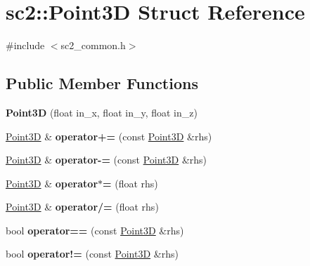 \hypertarget{structsc2_1_1_point3_d}{}\section{sc2\+:\+:Point3D Struct Reference}
\label{structsc2_1_1_point3_d}


{\ttfamily \#include $<$sc2\+\_\+common.\+h$>$}

\subsection*{Public Member Functions}
\begin{DoxyCompactItemize}
\item 
\mbox{\label{structsc2_1_1_point3_d_a7da22c63b07e4b874f2151f943f4c111}} 
{\bfseries Point3D} (float in\+\_\+x, float in\+\_\+y, float in\+\_\+z)
\item 
\mbox{\label{structsc2_1_1_point3_d_a84b5ebf7f19a364294347972bc489443}} 
\hyperlink{structsc2_1_1_point3_d}{Point3D} \& {\bfseries operator+=} (const \hyperlink{structsc2_1_1_point3_d}{Point3D} \&rhs)
\item 
\mbox{\label{structsc2_1_1_point3_d_ad0eeb862e04665ecad431a370b9a4282}} 
\hyperlink{structsc2_1_1_point3_d}{Point3D} \& {\bfseries operator-\/=} (const \hyperlink{structsc2_1_1_point3_d}{Point3D} \&rhs)
\item 
\mbox{\label{structsc2_1_1_point3_d_ac19e442b738bb0e8268edee5c4180880}} 
\hyperlink{structsc2_1_1_point3_d}{Point3D} \& {\bfseries operator$\ast$=} (float rhs)
\item 
\mbox{\label{structsc2_1_1_point3_d_a731d412bfa12d59dcb0eb5166fe9b3cd}} 
\hyperlink{structsc2_1_1_point3_d}{Point3D} \& {\bfseries operator/=} (float rhs)
\item 
\mbox{\label{structsc2_1_1_point3_d_aca425ef0bc6dda7ed80a42fd8f487597}} 
bool {\bfseries operator==} (const \hyperlink{structsc2_1_1_point3_d}{Point3D} \&rhs)
\item 
\mbox{\label{structsc2_1_1_point3_d_a84f9d0f7aa49ea9bcf6729b7d5180f6b}} 
bool {\bfseries operator!=} (const \hyperlink{structsc2_1_1_point3_d}{Point3D} \&rhs)
\end{DoxyCompactItemize}
